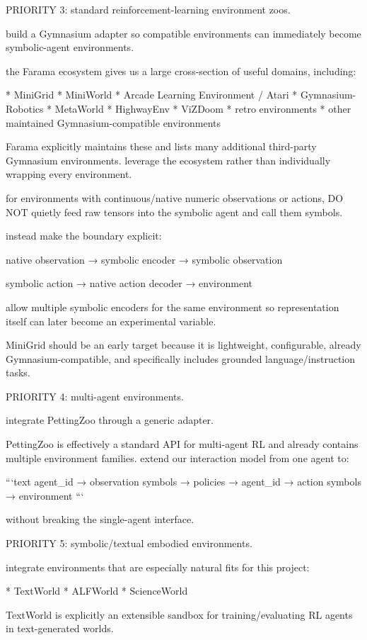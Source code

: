 PRIORITY 3: standard reinforcement-learning environment zoos.

build a Gymnasium adapter so compatible environments can immediately become symbolic-agent environments.

the Farama ecosystem gives us a large cross-section of useful domains, including:

* MiniGrid
* MiniWorld
* Arcade Learning Environment / Atari
* Gymnasium-Robotics
* MetaWorld
* HighwayEnv
* ViZDoom
* retro environments
* other maintained Gymnasium-compatible environments

Farama explicitly maintains these and lists many additional third-party Gymnasium environments. leverage the ecosystem rather than individually wrapping every environment.

for environments with continuous/native numeric observations or actions, DO NOT quietly feed raw tensors into the symbolic agent and call them symbols.

instead make the boundary explicit:

native observation
→ symbolic encoder
→ symbolic observation

symbolic action
→ native action decoder
→ environment

allow multiple symbolic encoders for the same environment so representation itself can later become an experimental variable.

MiniGrid should be an early target because it is lightweight, configurable, already Gymnasium-compatible, and specifically includes grounded language/instruction tasks.

PRIORITY 4: multi-agent environments.

integrate PettingZoo through a generic adapter.

PettingZoo is effectively a standard API for multi-agent RL and already contains multiple environment families. extend our interaction model from one agent to:

```text
{agent_id → observation symbols}
→ policies
→ {agent_id → action symbols}
→ environment
```

without breaking the single-agent interface.

PRIORITY 5: symbolic/textual embodied environments.

integrate environments that are especially natural fits for this project:

* TextWorld
* ALFWorld
* ScienceWorld

TextWorld is explicitly an extensible sandbox for training/evaluating RL agents in text-generated worlds.

